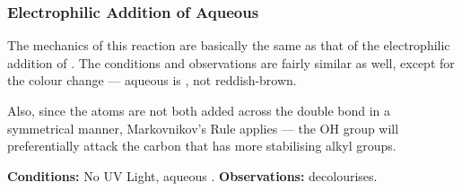 



		\subsubsection{Electrophilic Addition of Aqueous }

			The mechanics of this reaction are basically the same as that of the electrophilic addition of .
			The conditions and observations are fairly similar as well, except for the colour change –– aqueous
			 is , not reddish-brown.

			Also, since the  atoms are not both added across the double bond in a symmetrical manner,
			Markovnikov's Rule applies –– the OH group will preferentially attack the carbon that has more stabilising alkyl groups.

			\vspace{1.5em}
			\vbox{\textbf{Conditions:}	\tabto{35mm}No UV Light, aqueous .}	%
			\vbox{\textbf{Observations:}\tabto{35mm}  decolourises.}















